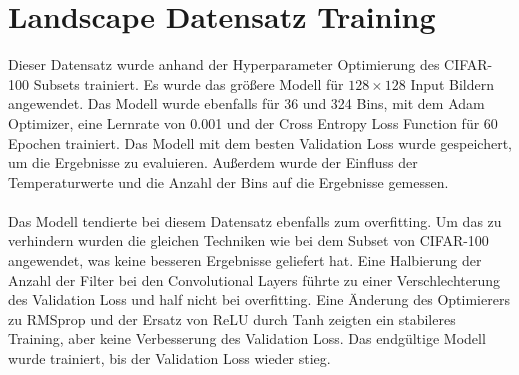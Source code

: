 \section{Landscape Datensatz Training}
Dieser Datensatz wurde anhand der Hyperparameter Optimierung des CIFAR-100 Subsets trainiert. Es wurde das größere Modell für $128 \times 128$
Input Bildern angewendet. Das Modell wurde ebenfalls für 36 und 324 Bins, mit dem Adam Optimizer, eine Lernrate von 0.001 und der Cross Entropy
Loss Function für 60 Epochen trainiert. Das Modell mit dem besten Validation Loss wurde gespeichert, um die Ergebnisse zu evaluieren. Außerdem
wurde der Einfluss der Temperaturwerte und die Anzahl der Bins auf die Ergebnisse gemessen.
\\
\\
Das Modell tendierte bei diesem Datensatz ebenfalls zum \gls{overfitting}. Um das zu verhindern wurden die gleichen Techniken wie bei dem Subset von CIFAR-100
angewendet, was keine besseren Ergebnisse geliefert hat. Eine Halbierung der Anzahl der Filter bei den Convolutional Layers führte zu einer Verschlechterung
des Validation Loss und half nicht bei \gls{overfitting}. Eine Änderung des Optimierers zu RMSprop und der Ersatz von ReLU durch Tanh zeigten
ein stabileres Training, aber keine Verbesserung des Validation Loss. Das endgültige Modell wurde trainiert, bis der Validation Loss wieder stieg.

